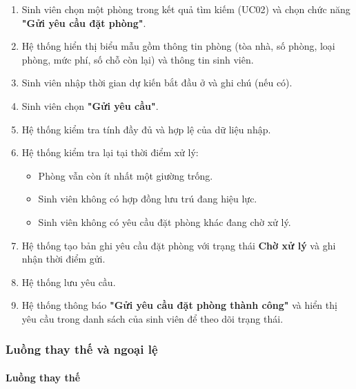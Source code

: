 \begin{enumerate}[leftmargin=1.6em]
\item Sinh viên chọn một phòng trong kết quả tìm kiếm (UC02) và chọn chức năng \textbf{"Gửi yêu cầu đặt phòng"}.
\item Hệ thống hiển thị biểu mẫu gồm thông tin phòng (tòa nhà, số phòng, loại phòng, mức phí, số chỗ còn lại) và thông tin sinh viên.
\item Sinh viên nhập thời gian dự kiến bắt đầu ở và ghi chú (nếu có).
\item Sinh viên chọn \textbf{"Gửi yêu cầu"}.
\item Hệ thống kiểm tra tính đầy đủ và hợp lệ của dữ liệu nhập.
\item Hệ thống kiểm tra lại tại thời điểm xử lý:
\begin{itemize}
\item Phòng vẫn còn ít nhất một giường trống.
\item Sinh viên không có hợp đồng lưu trú đang hiệu lực.
\item Sinh viên không có yêu cầu đặt phòng khác đang chờ xử lý.
\end{itemize}
\item Hệ thống tạo bản ghi yêu cầu đặt phòng với trạng thái \textbf{Chờ xử lý} và ghi nhận thời điểm gửi.
\item Hệ thống lưu yêu cầu.
\item Hệ thống thông báo \textbf{"Gửi yêu cầu đặt phòng thành công"} và hiển thị yêu cầu trong danh sách của sinh viên để theo dõi trạng thái.
\end{enumerate}

\subsubsection{Luồng thay thế và ngoại lệ}

\paragraph{Luồng thay thế}

